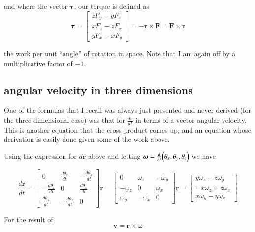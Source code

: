 \documentclass{article}      %
\newcommand{\D}[2] {\frac {d#2} {d#1}}
\newcommand{\Br}[0]{\mathbf{r}}
\newcommand{\Bv}[0]{\mathbf{v}}
\newcommand{\BF}[0]{\mathbf{F}}
\newcommand{\Btau}[0]{\boldsymbol{\tau}}
\newcommand{\Bomega}[0]{\boldsymbol{\omega}}
\newcommand{\cross}[0]{\times}
\begin{document}
and where the vector $\Btau$, our torque is defined as
\begin{equation*}
\Btau =
\begin{bmatrix}
z F_y - y F_z \\
x F_z - z F_x \\
y F_x - x F_y
\end{bmatrix}
=
-\Br \cross \BF
= \BF \cross \Br
\end{equation*}

the work per unit ``angle'' of rotation in space.  Note that I am again off by a multiplicative factor of $-1$.

\subsection{angular velocity in three dimensions}

One of the formulas that I recall was always just presented and never derived (for the three dimensional case)
was that for
$\D{t}{\Br}$ in terms of a vector angular velocity.  This is another equation that the cross product
comes up, and an equation whose derivation is easily done given some of the work above.

Using the expression for $d\Br$ above and letting $\Bomega = \D{t}{}\Bigl(\theta_x, \theta_y, \theta_z\Bigr)$ we have

\begin{equation*}
\D{t}{\Br}
=
\begin{bmatrix}
0 & \D{t}{\theta_z} & -\D{t}{\theta_y} \\
-\D{t}{\theta_z} & 0 & \D{t}{\theta_x} \\
\D{t}{\theta_y} & -\D{t}{\theta_x} & 0
\end{bmatrix} \Br
=
\begin{bmatrix}
0 & \omega_z & -\omega_y \\
-\omega_z & 0 & \omega_x \\
\omega_y & -\omega_x & 0
\end{bmatrix} \Br
=
\begin{bmatrix}
y \omega_z - z \omega_y \\
- x \omega_z + z \omega_x \\
x \omega_y - y \omega_x
\end{bmatrix}
\end{equation*}

For the result of
\begin{equation*}
\Bv = \Br \cross \Bomega
\end{equation*}
\end{document}
